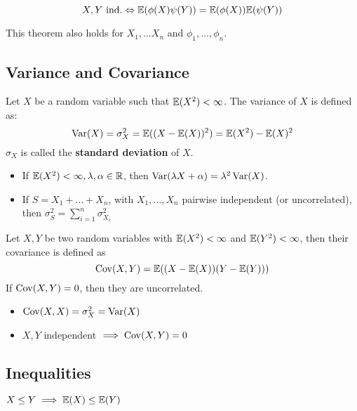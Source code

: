 \begin{theorem*}
  \[X, Y \ \text{ind.} \Leftrightarrow \mathbb{E}(\phi(X) \psi(Y)) = \mathbb{E}(\phi(X)) \mathbb{E}(\psi(Y))\]
\end{theorem*}
This theorem also holds for \(X_1, \ldots X_n\) and \(\phi_1, \ldots, \phi_n\).

\subsection{Variance and Covariance}
\begin{definition*}[Variance]
  Let \(X\) be a random variable such that \(\mathbb{E}(X^2) < \infty\). The variance of \(X\) is defined as:
  \vspace{-10pt}
  \[\operatorname{Var}(X) = \sigma_X^2 = \mathbb{E}((X - \mathbb{E}(X))^2) = \mathbb{E}(X^2) - \mathbb{E}(X)^2\]
  \(\sigma_X\) is called the \textbf{standard deviation} of \(X\).
\end{definition*}

\begin{itemize}
  \item If \(\mathbb{E}(X^2) < \infty, \lambda, \alpha \in \mathbb{R}\), then \(\operatorname{Var}(\lambda X + \alpha) = \lambda^2 \operatorname{Var}(X)\).
  \item If \(S = X_1 + \ldots + X_n\), with \(X_1, \ldots, X_n\) pairwise independent (or uncorrelated), then \(\sigma_S^2 = \sum_{i = 1}^n \sigma_{X_i}^2\)
\end{itemize}

\begin{definition*}[Covariance]
  Let \(X, Y\) be two random variables with \(\mathbb{E}(X^2) < \infty\) and \(\mathbb{E}(Y^2) < \infty\), then their covariance is defined as
  \vspace{-7pt}
  \[\operatorname{Cov}(X, Y) = \mathbb{E}((X - \mathbb{E}(X))(Y - \mathbb{E}(Y)))\]
  If \(\operatorname{Cov}(X, Y) = 0\), then they are uncorrelated.
\end{definition*}
\begin{itemize}
  \item \(\operatorname{Cov}(X, X) = \sigma_X^2 = \operatorname{Var}(X)\)
  \item \(X, Y\) independent \(\implies \operatorname{Cov}(X, Y) = 0\)
\end{itemize}

\subsection{Inequalities}
\begin{lemma}[Monotonicity]
  \(X \leq Y \implies \mathbb{E}(X) \leq \mathbb{E}(Y)\)
\end{lemma}

